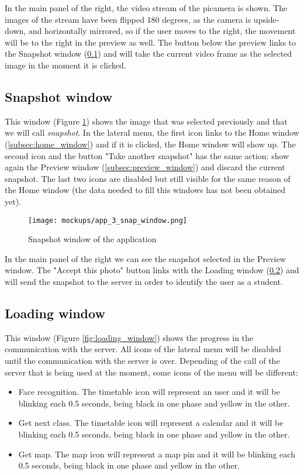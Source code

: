 	In the main panel of the right, the video stream of the \gls{picamera} is shown. The images of the stream have been flipped 180 degrees, as the camera is upside-down, and horizontally mirrored, so if the user moves to the right, the movement will be to the right in the preview as well. The button below the preview links to the Snapshot window (\ref{subsec:snapshot_window}) and will take the current video frame as the selected image in the moment it is clicked.

	\subsection{Snapshot window}
	\label{subsec:snapshot_window}
	This window (Figure \ref{fig:snap_window}) shows the image that was selected previously and that we will call \textit{\gls{snapshot}}. In the lateral menu, the first icon links to the Home window (\ref{subsec:home_window}) and if it is clicked, the Home window will show up. The second icon and the button "Take another snapshot" has the same action: show again the Preview window (\ref{subsec:preview_window}) and discard the current snapshot. The last two icons are disabled but still visible for the same reason of the Home window (the data needed to fill this windows has not been obtained yet).

	\begin{figure}[!ht]
		\centering
		\texttt{[image: mockups/app\_3\_snap\_window.png]}
		\caption{Snapshot window of the application}
		\label{fig:snap_window}
	\end{figure}

	In the main panel of the right we can see the snapshot selected in the Preview window. The "Accept this photo" button links with the Loading window (\ref{subsec:loading_window}) and will send the snapshot to the server in order to identify the user as a student.

	\subsection{Loading window}
	\label{subsec:loading_window}
	This window (Figure \ref{fig:loading_window}) shows the progress in the communication with the server. All icons of the lateral menu will be disabled until the communication with the server is over. Depending of the call of the server that is being used at the moment, some icons of the menu will be different:

	\begin{itemize}
		\item Face recognition. The timetable icon will represent an user and it will be blinking each 0.5 seconds, being black in one phase and yellow in the other. 
		\item Get next class. The timetable icon will represent a calendar and it will be blinking each 0.5 seconds, being black in one phase and yellow in the other.
		\item Get map. The map icon will represent a map pin and it will be blinking each 0.5 seconds, being black in one phase and yellow in the other.
	\end{itemize}

